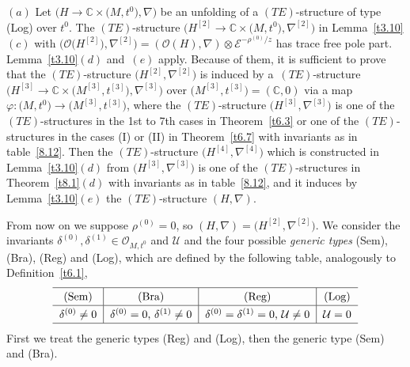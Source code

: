 \documentclass[10pt,a4paper]{amsart}
\numberwithin{equation}{section}
\numberwithin{figure}{section}
\newcommand{\C}{{\mathbb C}}
\newcommand{\EE}{{\mathcal E}}
\newcommand{\OO}{{\mathcal O}}
\newcommand{\UU}{{\mathcal U}}
\newcommand{\nnn}{\nabla}
\begin{document}
$(a)$ Let $\big(H\to\C\times \big(M,t^0\big),\nnn\big)$ be an unfolding of
a $(TE)$-structure of type (Log) over $t^0$.
The $(TE)$-structure $\big(H^{[2]}\to\C\times \big(M,t^0\big),\nnn^{[2]}\big)$
in Lemma~\ref{t3.10}$(c)$ with
$\big(\OO\big(H^{[2]}\big),\nnn^{[2]}\big)=(\OO(H),\nnn)\otimes
\EE^{-\rho^{(0)}/z}$ has trace free pole part.
Lemma~\ref{t3.10}$(d)$ and~$(e)$ apply.
Because of them, it is sufficient to prove that the
$(TE)$-structure $\big(H^{[2]},\nnn^{[2]}\big)$ is induced by
a~$(TE)$-structure
$\big(H^{[3]}\to\C\times \big(M^{[3]},t^{[3]}\big),\nnn^{[3]}\big)$
over $\big(M^{[3]},t^{[3]}\big)=(\C,0)$
via a map $\varphi\colon \big(M,t^0\big)\to\big(M^{[3]},t^{[3]}\big) $,
where the $(TE)$-structure $\big(H^{[3]},\nnn^{[3]}\big)$
is one of the $(TE)$-structures in the 1st to 7th cases
in Theorem~\ref{t6.3} or one of the $(TE)$-structures
in the cases (I) or (II) in Theorem~\ref{t6.7} with invariants as in table~\eqref{8.12}.
Then the $(TE)$-structure $\big(H^{[4]},\nnn^{[4]}\big)$ which is
constructed in Lemma~\ref{t3.10}$(d)$ from $\big(H^{[3]},\nnn^{[3]}\big)$
is one of the $(TE)$-structures in Theorem~\ref{t8.1}$(d)$
with invariants as in table~\eqref{8.12},
and it induces by Lemma~\ref{t3.10}$(e)$ the $(TE)$-structure
$(H,\nnn)$.


From now on we suppose $\rho^{(0)}=0$, so
$(H,\nnn)=\big(H^{[2]},\nnn^{[2]}\big)$.
We consider the invariants $\delta^{(0)},\delta^{(1)}\in
\OO_{M,t^0}$ and $\UU$ and the four possible {\it generic types}
(Sem), (Bra), (Reg) and (Log),
which are defined by the following table,
analogously to Definition~\ref{t6.1},{\samepage
\[
\def\arraystretch{1.3}
\begin{tabular}{c|c|c|c}
\hline
(Sem) & (Bra) & (Reg)& (Log)
\\ \hline
$\delta^{(0)}\neq 0$ & $\delta^{(0)}=0$, $\delta^{(1)}\neq 0$ &
$\delta^{(0)}=\delta^{(1)}=0$, $\UU\neq 0$ & $\UU=0$
\\
\hline
\end{tabular}
\]
First we treat the generic types (Reg) and (Log),
then the generic type (Sem) and (Bra).}
\end{document}
